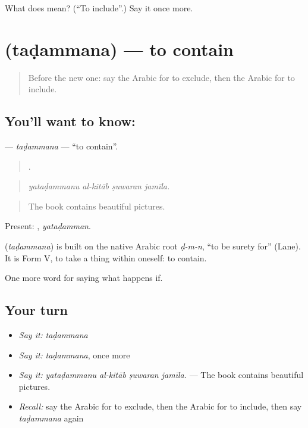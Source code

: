 \begin{tcolorbox}[breakable,colback=teal!4,colframe=teal!35!black,title={Before you move on}]
What does  mean? (\textquotedblleft{}To include\textquotedblright{}.) Say it once more.
\end{tcolorbox}
\section[\texorpdfstring{\ar{تضمن} (taḍammana)}{تضمن (taḍammana)}]{ (taḍammana) — to contain}

\label{lesson:AR-C405-tadammana}



\begin{quote}
Before the new one: say the Arabic for to exclude, then the Arabic for to include.
\end{quote}

\subsection*{You'll want to know: }
\textbf{} — \emph{taḍammana} — \textquotedblleft{}to contain\textquotedblright{}.

\begin{quote}
   .
\end{quote}

\begin{quote}
\emph{yataḍammanu al-kitāb ṣuwaran jamīla.}
\end{quote}

\begin{quote}
The book contains beautiful pictures.
\end{quote}

Present: , \emph{yataḍamman}.

\begin{cousinweb}
\textbf{} (\emph{taḍammana}) is built on the native Arabic root \emph{ḍ-m-n}, \textquotedblleft{}to be surety for\textquotedblright{} (Lane). It is Form V, to take a thing within oneself: to contain.
\end{cousinweb}

\begin{grammarlens}[title={What you've built}]
One more word for saying what happens if.
\end{grammarlens}

\subsection*{Your turn}
\begin{itemize}
\raggedright
  \item \emph{Say it:} \emph{taḍammana}
  \item \emph{Say it:} \emph{taḍammana}, once more
  \item \emph{Say it:} \emph{yataḍammanu al-kitāb ṣuwaran jamīla.} — The book contains beautiful pictures.
  \item \emph{Recall:} say the Arabic for to exclude, then the Arabic for to include, then say \emph{taḍammana} again
\end{itemize}

